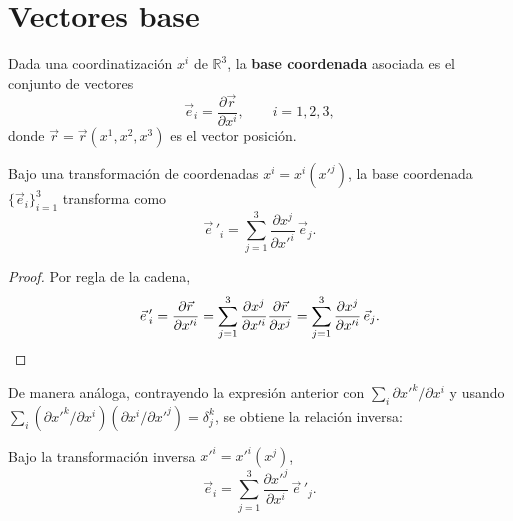 \section{Vectores base}

\begin{definicion}
Dada una coordinatización $x^i$ de $\mathbb{R}^3$, la \textbf{base
coordenada} asociada es el conjunto de vectores
\[
\vec{e}_i = \frac{\partial \vec{r}}{\partial x^i}, \qquad i=1,2,3,
\]
donde $\vec{r}=\vec r(x^1,x^2,x^3)$ es el vector posición.
\end{definicion}

\begin{proposicionc}
Bajo una transformación de coordenadas $x^i = x^i(x'^j)$, la base
coordenada $\{\vec e_i\}_{i=1}^3$ transforma como
\[
\vec{e}\,'_i = \sum_{j=1}^{3} \frac{\partial x^j}{\partial x'^i}\, \vec e_j
.
\]
\end{proposicionc}

\begin{proof}
Por regla de la cadena,
\[
\vec e\,'_i = \frac{\partial \vec r}{\partial x'^i} =
\sum_{j=1}^{3} \frac{\partial x^j}{\partial x'^i}
\frac{\partial \vec r}{\partial x^j} =
\sum_{j=1}^{3} \frac{\partial x^j}{\partial x'^i}\, \vec e_j . \qedhere
\]
\end{proof}

De manera análoga, contrayendo la expresión anterior con
$\sum_i \partial x'^k/\partial x^i$ y usando
$\sum_i (\partial x'^k/\partial x^i)(\partial x^i/\partial x'^j) =
\delta^k_j$, se obtiene la relación inversa:

\begin{proposicionc}
Bajo la transformación inversa $x'^i=x'^i(x^j)$,
\[
\vec e_i = \sum_{j=1}^{3} \frac{\partial x'^j}{\partial x^i}\, \vec e\,'_j
.
\]
\end{proposicionc}

